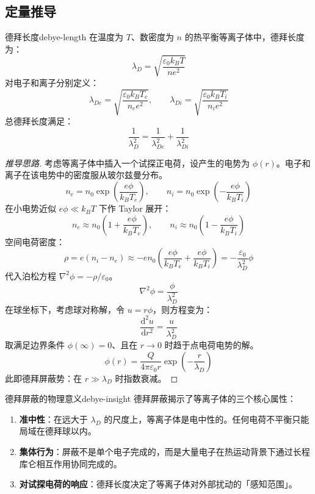 \documentclass[12pt,a4paper,openany,oneside]{book}
\newcommand{\diff}{\mathrm{d}}
\newcommand{\eps}{\varepsilon}
\newcommand{\lap}{\nabla^2}
\begin{document}
\subsection{定量推导}

\begin{theorem}{德拜长度}{debye-length}
在温度为 $T$、数密度为 $n$ 的热平衡等离子体中，德拜长度为：
\[
\lambda_D = \sqrt{\frac{\eps_0 k_B T}{n e^2}}
\label{eq:debye-length}
\]
对电子和离子分别定义：
\[
\lambda_{De} = \sqrt{\frac{\eps_0 k_B T_e}{n_e e^2}}, \qquad \lambda_{Di} = \sqrt{\frac{\eps_0 k_B T_i}{n_i e^2}}
\]
总德拜长度满足：
\[
\frac{1}{\lambda_D^2} = \frac{1}{\lambda_{De}^2} + \frac{1}{\lambda_{Di}^2}
\]
\end{theorem}

\begin{proof}[推导思路]
考虑等离子体中插入一个试探正电荷，设产生的电势为 $\phi(r)$。电子和离子在该电势中的密度服从玻尔兹曼分布。
\[
n_e = n_0 \exp\left(\frac{e\phi}{k_B T_e}\right), \qquad n_i = n_0 \exp\left(-\frac{e\phi}{k_B T_i}\right)
\]
在小电势近似 $e\phi \ll k_B T$ 下作 Taylor 展开：
\[
n_e \approx n_0\left(1 + \frac{e\phi}{k_B T_e}\right), \qquad n_i \approx n_0\left(1 - \frac{e\phi}{k_B T_i}\right)
\]
空间电荷密度：
\[
\rho = e(n_i - n_e) \approx -en_0\left(\frac{e\phi}{k_B T_e} + \frac{e\phi}{k_B T_i}\right) = -\frac{\eps_0}{\lambda_D^2}\phi
\]
代入泊松方程 $\lap\phi = -\rho/\eps_0$。
\[
\lap\phi = \frac{\phi}{\lambda_D^2}
\]
在球坐标下，考虑球对称解，令 $u=r\phi$，则方程变为：
\[
\frac{\diff^2 u}{\diff r^2} = \frac{u}{\lambda_D^2}
\]
取满足边界条件 $\phi(\infty)=0$、且在 $r\to 0$ 时趋于点电荷电势的解。
\[
\phi(r) = \frac{Q}{4\pi\eps_0 r} \exp\left(-\frac{r}{\lambda_D}\right)
\]
此即德拜屏蔽势：在 $r \gg \lambda_D$ 时指数衰减。
\end{proof}

\begin{insight}{德拜屏蔽的物理意义}{debye-insight}
德拜屏蔽揭示了等离子体的三个核心属性：
\begin{enumerate}
\item \textbf{准中性}：在远大于 $\lambda_D$ 的尺度上，等离子体是电中性的。任何电荷不平衡只能局域在德拜球以内。
\item \textbf{集体行为}：屏蔽不是单个电子完成的，而是大量电子在热运动背景下通过长程库仑相互作用协同完成的。
\item \textbf{对试探电荷的响应}：德拜长度决定了等离子体对外部扰动的「感知范围」。
\end{enumerate}
\end{insight}
\end{document}
